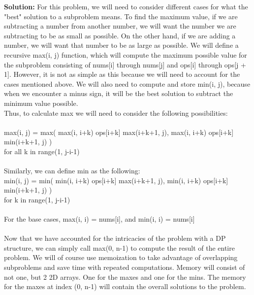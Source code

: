 \documentclass[10pt]{article}
\newcommand{\solution}[1]{\color{blue}\hfill\break\noindent\textbf{Solution:} #1\color{black}}
\begin{document}
    \solution{
        For this problem, we will need to consider different cases for what the "best" solution to a subproblem means. To find the maximum value, if we are subtracting a number from another number, we will want the number we are subtracting to be as small as possible. On the other hand, if we are adding a number, we will want that number to be as large as possible. We will define a recursive max(i, j) function, which will compute the maximum possible value for the subproblem consisting of nums[i] through nums[j] and ops[i] through ops[j + 1]. However, it is not as simple as this because we will need to account for the cases mentioned above. We will also need to compute and store min(i, j), because when we encounter a minus sign, it will be the best solution to subtract the minimum value possible. \\
        Thus, to calculate max we will need to consider the following possibilities: \\ \\
        max(i, j) =
        max( max(i, i+k) ops[i+k] max(i+k+1, j),
        \null \quad max(i, i+k) ops[i+k] min(i+k+1, j) ) \\
        for all k in range(1, j-i-1) \\ \\
        Similarly, we can define min as the following: \\
        min(i, j) = min( min(i, i+k) ops[i+k] max(i+k+1, j), 
        \null \quad min(i, i+k) ops[i+k] min(i+k+1, j) ) \\
        for k in  range(1, j-i-1) \\ \\
        For the base cases, max(i, i) = nums[i], and min(i, i) = nums[i] \\ \\
        Now that we have accounted for the intricacies of the problem with a DP structure, we can simply call max($0$, n-1) to compute the result of the entire problem. We will of course use memoization to take advantage of overlapping subproblems and save time with repeated computations. Memory will consist of not one, but 2 2D arrays. One for the maxes and one for the mins. The memory for the maxes at index ($0$, n-1) will contain the overall solutions to the problem.
        
    }
  
\end{document}
